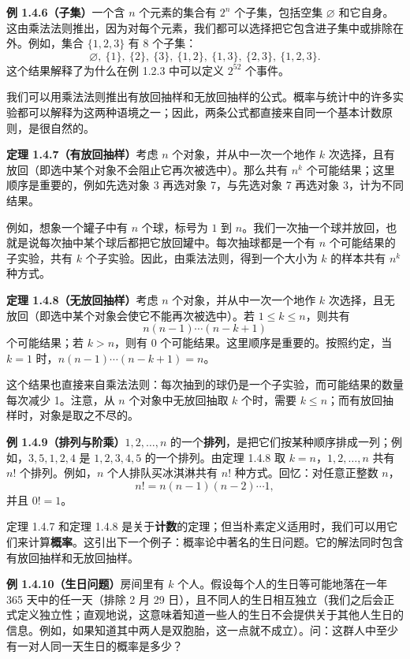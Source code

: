 \documentclass[UTF8,12pt,a4paper,fontset=fandol]{ctexart}
\begin{document}
\noindent\textbf{例 1.4.6（子集）}\quad 一个含 $n$ 个元素的集合有 $2^n$ 个子集，包括空集 $\varnothing$ 和它自身。这由乘法法则推出，因为对每个元素，我们都可以选择把它包含进子集中或排除在外。例如，集合 $\{1,2,3\}$ 有 8 个子集：
\[
  \varnothing,\ \{1\},\ \{2\},\ \{3\},\ \{1,2\},\ \{1,3\},\ \{2,3\},\ \{1,2,3\}.
\]
这个结果解释了为什么在例 1.2.3 中可以定义 $2^{52}$ 个事件。

我们可以用乘法法则推出有放回抽样和无放回抽样的公式。概率与统计中的许多实验都可以解释为这两种语境之一；因此，两条公式都直接来自同一个基本计数原则，是很自然的。

\noindent\textbf{定理 1.4.7（有放回抽样）}\quad 考虑 $n$ 个对象，并从中一次一个地作 $k$ 次选择，且有放回（即选中某个对象不会阻止它再次被选中）。那么共有 $n^k$ 个可能结果；这里顺序是重要的，例如先选对象 3 再选对象 7，与先选对象 7 再选对象 3，计为不同结果。

例如，想象一个罐子中有 $n$ 个球，标号为 $1$ 到 $n$。我们一次抽一个球并放回，也就是说每次抽中某个球后都把它放回罐中。每次抽球都是一个有 $n$ 个可能结果的子实验，共有 $k$ 个子实验。因此，由乘法法则，得到一个大小为 $k$ 的样本共有 $n^k$ 种方式。

\noindent\textbf{定理 1.4.8（无放回抽样）}\quad 考虑 $n$ 个对象，并从中一次一个地作 $k$ 次选择，且无放回（即选中某个对象会使它不能再次被选中）。若 $1\le k\le n$，则共有
\[
  n(n-1)\cdots(n-k+1)
\]
个可能结果；若 $k>n$，则有 0 个可能结果。这里顺序是重要的。按照约定，当 $k=1$ 时，$n(n-1)\cdots(n-k+1)=n$。

这个结果也直接来自乘法法则：每次抽到的球仍是一个子实验，而可能结果的数量每次减少 1。注意，从 $n$ 个对象中无放回抽取 $k$ 个时，需要 $k\le n$；而有放回抽样时，对象是取之不尽的。

\noindent\textbf{例 1.4.9（排列与阶乘）}\quad $1,2,\ldots,n$ 的一个\textbf{排列}，是把它们按某种顺序排成一列；例如，$3,5,1,2,4$ 是 $1,2,3,4,5$ 的一个排列。由定理 1.4.8 取 $k=n$，$1,2,\ldots,n$ 共有 $n!$ 个排列。例如，$n$ 个人排队买冰淇淋共有 $n!$ 种方式。回忆：对任意正整数 $n$，
\[
  n!=n(n-1)(n-2)\cdots 1,
\]
并且 $0!=1$。

定理 1.4.7 和定理 1.4.8 是关于\textbf{计数}的定理；但当朴素定义适用时，我们可以用它们来计算\textbf{概率}。这引出下一个例子：概率论中著名的生日问题。它的解法同时包含有放回抽样和无放回抽样。

\noindent\textbf{例 1.4.10（生日问题）}\quad 房间里有 $k$ 个人。假设每个人的生日等可能地落在一年 365 天中的任一天（排除 2 月 29 日），且不同人的生日相互独立（我们之后会正式定义独立性；直观地说，这意味着知道一些人的生日不会提供关于其他人生日的信息。例如，如果知道其中两人是双胞胎，这一点就不成立）。问：这群人中至少有一对人同一天生日的概率是多少？
\end{document}
